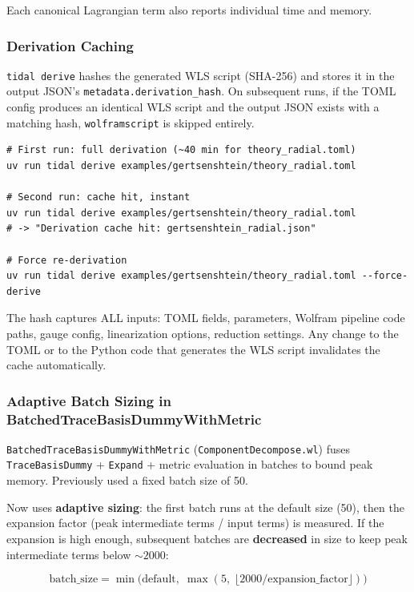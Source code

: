 Each canonical Lagrangian term also reports individual time and memory.

\subsubsection{Derivation Caching}

\texttt{tidal derive} hashes the generated WLS script (SHA-256) and stores it in the output JSON's \texttt{metadata.derivation\_hash}. On subsequent runs, if the TOML config produces an identical WLS script and the output JSON exists with a matching hash, \texttt{wolframscript} is skipped entirely.

\begin{lstlisting}[style=bash]
# First run: full derivation (~40 min for theory_radial.toml)
uv run tidal derive examples/gertsenshtein/theory_radial.toml

# Second run: cache hit, instant
uv run tidal derive examples/gertsenshtein/theory_radial.toml
# -> "Derivation cache hit: gertsenshtein_radial.json"

# Force re-derivation
uv run tidal derive examples/gertsenshtein/theory_radial.toml --force-derive
\end{lstlisting}

The hash captures ALL inputs: TOML fields, parameters, Wolfram pipeline code paths, gauge config, linearization options, reduction settings. Any change to the TOML or to the Python code that generates the WLS script invalidates the cache automatically.

\subsubsection{Adaptive Batch Sizing in BatchedTraceBasisDummyWithMetric}
\label{sec:adaptive-batch}

\texttt{BatchedTraceBasisDummyWithMetric} (\texttt{ComponentDecompose.wl}) fuses \texttt{TraceBasisDummy} + \texttt{Expand} + metric evaluation in batches to bound peak memory. Previously used a fixed batch size of 50.

Now uses \textbf{adaptive sizing}: the first batch runs at the default size (50), then the expansion factor (peak intermediate terms / input terms) is measured. If the expansion is high enough, subsequent batches are \textbf{decreased} in size to keep peak intermediate terms below ${\sim}2000$:

\begin{equation}
  \text{batch\_size} = \min\!\bigl(\text{default},\; \max(5,\; \lfloor 2000 / \text{expansion\_factor} \rfloor)\bigr)
  \label{eq:adaptive-batch}
\end{equation}

